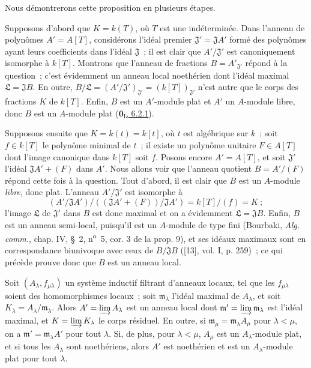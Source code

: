 Nous démontrerons cette proposition en plusieurs étapes.

\begin{env}[10.3.1.1]
\label{0.10.3.1.1-fr}
Supposons d'abord que $K=k(T)$, où $T$ est une indéterminée. Dans l'anneau de
polynômes $A'=A[T]$, considérons l'idéal premier
$\mathfrak J'=\mathfrak J A'$ formé des
polynômes ayant leurs coefficients dans l'idéal $\mathfrak J$~; il est clair
que $A'/\mathfrak J'$ est canoniquement isomorphe à $k[T]$. Montrons que
l'anneau de fractions $B=A'_{\mathfrak J'}$ répond à la question~; c'est
évidemment un anneau local noethérien dont l'idéal maximal
$\mathfrak L=\mathfrak J B$. En outre,
$B/\mathfrak L=(A'/\mathfrak J')_{\mathfrak J'}=(k[T])_{\mathfrak J'}$
n'est autre que le corps des fractions $K$ de $k[T]$. Enfin, $B$ est un
$A'$-module plat et $A'$ un $A$-module libre, donc $B$ est un $A$-module plat
(\hyperref[0.6.2.1-fr]{$\mathbf{0}_{\mathrm I}$, 6.2.1}).
\end{env}

\begin{env}[10.3.1.2]
\label{0.10.3.1.2-fr}
Supposons ensuite que $K=k(t)=k[t]$, où $t$ est algébrique sur $k$~; soit
$f\in k[T]$ le polynôme minimal de $t$~; il existe un polynôme unitaire
$F\in A[T]$ dont l'image canonique dans $k[T]$ soit $f$. Posons encore
$A'=A[T]$, et soit $\mathfrak J'$ l'idéal $\mathfrak J A'+(F)$ dans $A'$.
Nous allons voir que l'anneau quotient $B=A'/(F)$ répond cette fois à la
question. Tout d'abord, il est clair que $B$ est un $A$-module \emph{libre},
donc plat. L'anneau $A'/\mathfrak J'$ est isomorphe à
\[
  (A'/\mathfrak J A')/((\mathfrak J A'+(F))/\mathfrak J A')
  =k[T]/(f)=K~;
\]
l'image $\mathfrak L$ de $\mathfrak J'$ dans $B$ est donc maximal et on a
évidemment $\mathfrak L=\mathfrak J B$. Enfin, $B$ est un anneau semi-local,
puisqu'il est un $A$-module de type fini (Bourbaki, \emph{Alg. comm.}, chap.
IV, \S~2, n\textsuperscript{o}~5, cor. 3 de la prop. 9), et ses idéaux
maximaux sont en correspondance biunivoque avec ceux de $B/\mathfrak J B$
([13], vol. I, p. 259)~; ce qui précède prouve donc que $B$ est un anneau
local.
\end{env}

\begin{lemma}[10.3.1.3]
\label{0.10.3.1.3-fr}
Soit $(A_\lambda,f_{\mu\lambda})$ un système inductif filtrant d'anneaux
locaux, tel que les $f_{\mu\lambda}$ soient des homomorphismes locaux~; soit
$\mathfrak m_\lambda$ l'idéal maximal de $A_\lambda$, et soit
$K_\lambda=A_\lambda/\mathfrak m_\lambda$. Alors
$A'=\varinjlim A_\lambda$ est un anneau local dont
$\mathfrak m'=\varinjlim\mathfrak m_\lambda$ est l'idéal maximal, et
$K=\varinjlim K_\lambda$ le corps résiduel. En outre, si
$\mathfrak m_\mu=\mathfrak m_\lambda A_\mu$ pour $\lambda<\mu$, on a
$\mathfrak m'=\mathfrak m_\lambda A'$ pour tout $\lambda$. Si, de plus, pour
$\lambda<\mu$, $A_\mu$ est un $A_\lambda$-module plat, et si tous les
$A_\lambda$ sont noethériens, alors $A'$ est noethérien et est un
$A_\lambda$-module plat pour tout $\lambda$.
\end{lemma}

